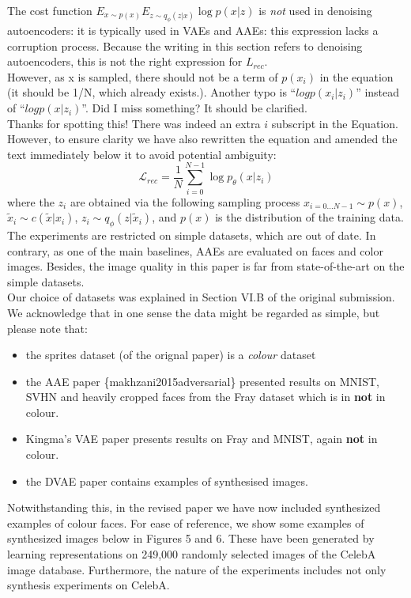 \documentclass[a4paper,11pt]{article}
\begin{document}
The cost function $E_{x\sim p(x)} E_{z\sim q_\phi(z|x)} \log p(x | z)$ is {\em not} used in denoising autoencoders: it is typically used in VAEs and AAEs: this expression lacks a corruption process. Because the writing in this section refers to denoising autoencoders, this is not the right expression for $L_{rec}$.\\

{\color{blue} However, as x is sampled, there should not be a term of $p(x_i)$ in the equation (it should be 1/N, which already exists.). Another typo is “$log p(x_i | z_i)$” instead of “$log p(x | z_i)$”. Did I miss something? It should be clarified.}\\

Thanks for spotting this!  There was indeed an extra $i$ subscript in the Equation. However, to ensure clarity we have also rewritten the equation and amended the text immediately below it to avoid potential ambiguity:
{\color{red}
\[ \mathcal{L}_{rec} = \frac{1}{N}\sum_{i=0}^{N-1} \log p_\theta(x|z_i)\]
where the $z_i$ are obtained via the following sampling process $x_{i=0...N-1} \sim p(x)$, $\tilde{x}_i \sim c(\tilde{x}|x_i)$, $z_i \sim q_\phi(z|\tilde{x}_i)$, and $p(x)$ is the distribution of the training data.}\\


{\color{blue}
The experiments are restricted on simple datasets, which are out of date. In contrary, as one of the main baselines, AAEs are evaluated on faces and color images. Besides, the image quality in this paper is far from state-of-the-art on the simple datasets.}\\

Our choice of datasets was explained in Section VI.B of the original submission.  We acknowledge that in one sense the data might be regarded as simple, but please note that: 
\begin{itemize}
    \item the sprites dataset (of the orignal paper) is a {\em colour} dataset
    \item the AAE paper \{makhzani2015adversarial\} presented results on MNIST, SVHN and heavily cropped faces from the Fray dataset which is in \textbf{not} in colour.
    \item Kingma's VAE paper presents results on Fray and MNIST, again \textbf{not} in colour.
    \item the DVAE paper contains examples of synthesised images.
\end{itemize} 
Notwithstanding this, in the revised paper we have now included synthesized examples of colour faces. For ease of reference, we show some examples of synthesized images below in Figures 5 and 6. These have been generated by learning representations on 249,000 randomly selected images of the CelebA image database. Furthermore, the nature of the experiments includes not only synthesis experiments on CelebA.\\
\end{document}
